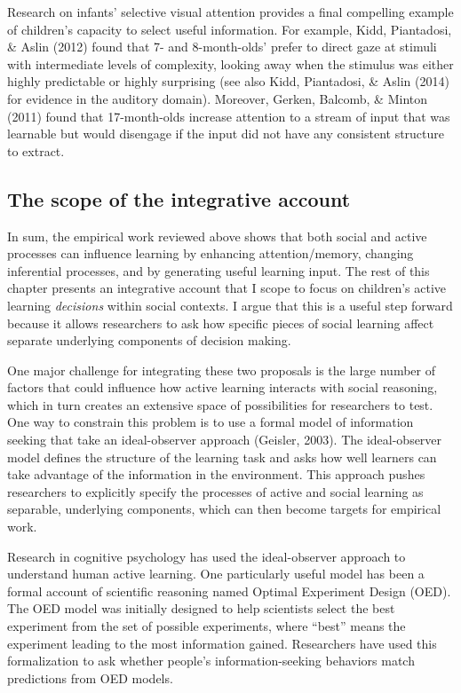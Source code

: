 \documentclass[oneside]{report}
\begin{document}
Research on infants' selective visual attention provides a final
compelling example of children's capacity to select useful information.
For example, Kidd, Piantadosi, \& Aslin (2012) found that 7- and
8-month-olds' prefer to direct gaze at stimuli with intermediate levels
of complexity, looking away when the stimulus was either highly
predictable or highly surprising (see also Kidd, Piantadosi, \& Aslin
(2014) for evidence in the auditory domain). Moreover, Gerken, Balcomb,
\& Minton (2011) found that 17-month-olds increase attention to a stream
of input that was learnable but would disengage if the input did not
have any consistent structure to extract.

\subsection{The scope of the integrative
account}\label{the-scope-of-the-integrative-account}

In sum, the empirical work reviewed above shows that both social and
active processes can influence learning by enhancing attention/memory,
changing inferential processes, and by generating useful learning input.
The rest of this chapter presents an integrative account that I scope to
focus on children's active learning \emph{decisions} within social
contexts. I argue that this is a useful step forward because it allows
researchers to ask how specific pieces of social learning affect
separate underlying components of decision making.

One major challenge for integrating these two proposals is the large
number of factors that could influence how active learning interacts
with social reasoning, which in turn creates an extensive space of
possibilities for researchers to test. One way to constrain this problem
is to use a formal model of information seeking that take an
ideal-observer approach (Geisler, 2003). The ideal-observer model
defines the structure of the learning task and asks how well learners
can take advantage of the information in the environment. This approach
pushes researchers to explicitly specify the processes of active and
social learning as separable, underlying components, which can then
become targets for empirical work.

Research in cognitive psychology has used the ideal-observer approach to
understand human active learning. One particularly useful model has been
a formal account of scientific reasoning named Optimal Experiment Design
(OED). The OED model was initially designed to help scientists select
the best experiment from the set of possible experiments, where ``best''
means the experiment leading to the most information gained. Researchers
have used this formalization to ask whether people's information-seeking
behaviors match predictions from OED models.
\end{document}
